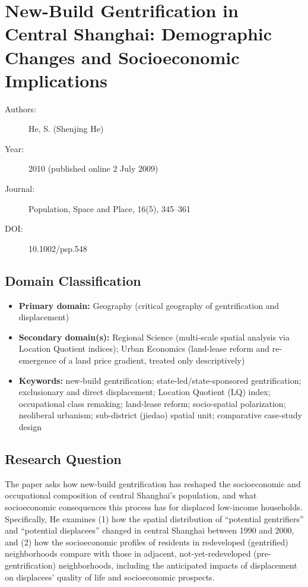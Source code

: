 \section{New-Build Gentrification in Central Shanghai: Demographic Changes and Socioeconomic Implications}

\begin{description}
  \item[Authors:] He, S. (Shenjing He)
  \item[Year:] 2010 (published online 2 July 2009)
  \item[Journal:] Population, Space and Place, 16(5), 345--361
  \item[DOI:] 10.1002/psp.548
\end{description}

\subsection*{Domain Classification}

\begin{itemize}
  \item \textbf{Primary domain:} Geography (critical geography of gentrification and displacement)
  \item \textbf{Secondary domain(s):} Regional Science (multi-scale spatial analysis via Location Quotient indices); Urban Economics (land-lease reform and re-emergence of a land price gradient, treated only descriptively)
  \item \textbf{Keywords:} new-build gentrification; state-led/state-sponsored gentrification; exclusionary and direct displacement; Location Quotient (LQ) index; occupational class remaking; land-lease reform; socio-spatial polarization; neoliberal urbanism; sub-district (jiedao) spatial unit; comparative case-study design
\end{itemize}

\subsection*{Research Question}

The paper asks how new-build gentrification has reshaped the socioeconomic and occupational composition of central Shanghai's population, and what socioeconomic consequences this process has for displaced low-income households. Specifically, He examines (1) how the spatial distribution of ``potential gentrifiers'' and ``potential displacees'' changed in central Shanghai between 1990 and 2000, and (2) how the socioeconomic profiles of residents in redeveloped (gentrified) neighborhoods compare with those in adjacent, not-yet-redeveloped (pre-gentrification) neighborhoods, including the anticipated impacts of displacement on displacees' quality of life and socioeconomic prospects.


